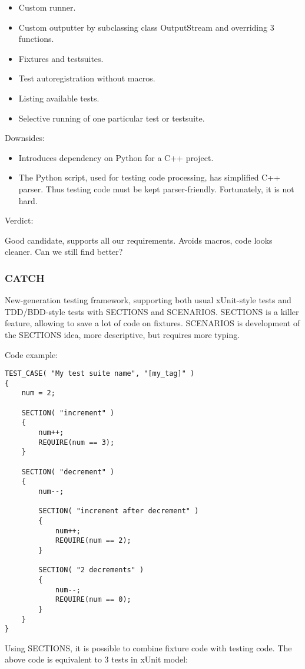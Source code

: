 \documentclass[10pt, a5paper]{article}
\begin{document}
\begin{itemize}
  \item Custom runner.
  \item Custom outputter by subclassing class OutputStream and \linebreak overriding 3 functions.
  \item Fixtures and testsuites.
  \item Test autoregistration without macros.
  \item Listing available tests.
  \item Selective running of one particular test or testsuite.
\end{itemize}

Downsides:

\begin{itemize}
  \item Introduces dependency on Python for a C++ project.
  \item The Python script, used for testing code processing, has simplified C++ parser. Thus testing code must be kept parser-friendly. Fortunately, it is not hard.
\end{itemize}

Verdict:

Good candidate, supports all our requirements. Avoids macros, code looks cleaner. Can we still find better?

\subsubsection*{CATCH}

New-generation testing framework, supporting both usual xUnit-style tests and TDD/BDD-style tests with SECTIONS and \linebreak SCENARIOS. SECTIONS is a killer feature, allowing to save a lot of code on fixtures. SCENARIOS is development of the SECTIONS idea, more descriptive, but requires more typing.

Code example:

\begin{verbatim}
TEST_CASE( "My test suite name", "[my_tag]" )
{
    num = 2;

    SECTION( "increment" )
    {
        num++;
        REQUIRE(num == 3);
    }

    SECTION( "decrement" )
    {
        num--;

        SECTION( "increment after decrement" )
        {
            num++;
            REQUIRE(num == 2);
        }

        SECTION( "2 decrements" )
        {
            num--;
            REQUIRE(num == 0);
        }
    }
}
\end{verbatim}
Using SECTIONS, it is possible to combine fixture code with testing code. The above code is equivalent to 3 tests in xUnit model:
\end{document}

